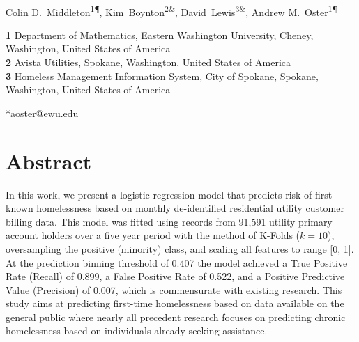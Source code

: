 \documentclass[10pt,letterpaper]{article}
\begin{document}
\vspace*{0.2in}

\begin{flushleft}
{\Large
\textbf{} %
}
\newline
\\
Colin D.\ Middleton\textsuperscript{1\P},
Kim\ Boynton\textsuperscript{2\&},
David\ Lewis\textsuperscript{3\&},
Andrew M.\ Oster\textsuperscript{1\P*}\\

\bigskip

\textbf{1} Department of Mathematics, Eastern Washington University, Cheney, Washington, United States of America \\
\textbf{2} Avista Utilities, Spokane, Washington, United States of America \\
\textbf{3} Homeless Management Information System, City of Spokane, Spokane, Washington, United States of America \\
\bigskip





*aoster@ewu.edu

\end{flushleft}
\section*{Abstract}
In this work, we present a logistic regression model that predicts risk of first known homelessness based on monthly de-identified residential utility customer billing data. This model was fitted using records from 91,591 utility primary account holders over a five year period with the method of K-Folds ($k=10$), oversampling the positive (minority) class, and scaling all features to range [0, 1]. At the prediction binning threshold of 0.407 the model achieved a True Positive Rate (Recall) of 0.899, a False Positive Rate of 0.522, and a Positive Predictive Value (Precision) of 0.007, which is commensurate with existing research. This study aims at predicting first-time homelessness based on data available on the general public where nearly all precedent research focuses on predicting chronic homelessness based on individuals already seeking assistance.
\end{document}
